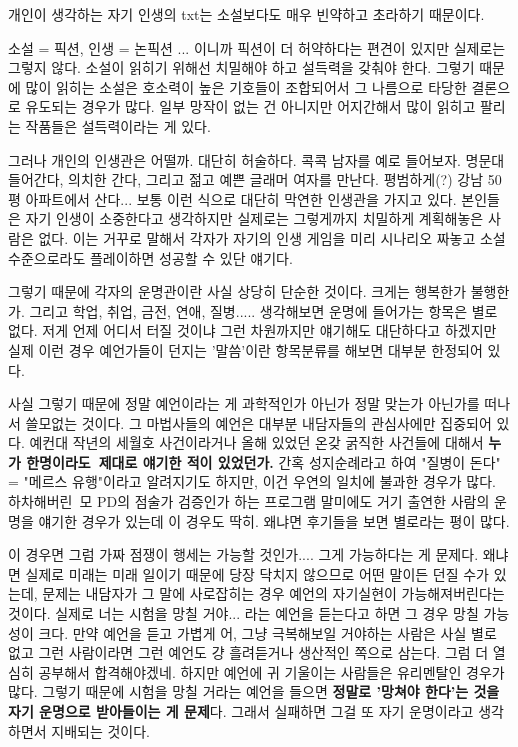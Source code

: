개인이 생각하는 자기 인생의 txt는
소설보다도 매우 빈약하고 초라하기 때문이다.
\vspace{5mm}

소설 = 픽션, 인생 = 논픽션 ... 이니까 픽션이 더 허약하다는 편견이 있지만 실제로는 그렇지 않다.
소설이 읽히기 위해선 치밀해야 하고 설득력을 갖춰야 한다.
그렇기 때문에 많이 읽히는 소설은 호소력이 높은 기호들이 조합되어서 그 나름으로 타당한 결론으로 유도되는 경우가 많다.
일부 망작이 없는 건 아니지만 어지간해서 많이 읽히고 팔리는 작품들은 설득력이라는 게 있다.
\vspace{5mm}

그러나 개인의 인생관은 어떨까.
대단히 허술하다.
콕콕 남자를 예로 들어보자.
명문대 들어간다, 의치한 간다, 그리고 젊고 예쁜 글래머 여자를 만난다.
평범하게(?) 강남 50평 아파트에서 산다...
보통 이런 식으로 대단히 막연한 인생관을 가지고 있다.
본인들은 자기 인생이 소중한다고 생각하지만 실제로는 그렇게까지 치밀하게 계획해놓은 사람은 없다.
이는 거꾸로 말해서 각자가 자기의 인생 게임을 미리 시나리오 짜놓고 소설 수준으로라도 플레이하면 성공할 수 있단 얘기다.
\vspace{5mm}

그렇기 때문에 각자의 운명관이란 사실 상당히 단순한 것이다.
크게는 행복한가 불행한가.
그리고 학업, 취업, 금전, 연애, 질병.....
생각해보면 운명에 들어가는 항목은 별로 없다.
저게 언제 어디서 터질 것이냐 그런 차원까지만 얘기해도 대단하다고 하겠지만
실제 이런 경우 예언가들이 던지는 '말씀'이란 항목분류를 해보면 대부분 한정되어 있다.
\vspace{5mm}

사실 그렇기 때문에 정말 예언이라는 게 과학적인가 아닌가 정말 맞는가 아닌가를 떠나서 쓸모없는 것이다.
그 마법사들의 예언은 대부분 내담자들의 관심사에만 집중되어 있다.
예컨대 작년의 세월호 사건이라거나 올해 있었던 온갖 굵직한 사건들에 대해서 \textbf{누가 한명이라도 제대로 얘기한 적이 있었던가.}
간혹 성지순례라고 하여 "질병이 돈다" = "메르스 유행"이라고 알려지기도 하지만, 이건 우연의 일치에 불과한 경우가 많다.
하차해버린 모 PD의 점술가 검증인가 하는 프로그램 말미에도 거기 출연한 사람의 운명을 얘기한 경우가 있는데
이 경우도 딱히. 왜냐면 후기들을 보면 별로라는 평이 많다.
\vspace{5mm}

이 경우면 그럼 가짜 점쟁이 행세는 가능할 것인가.... 그게 가능하다는 게 문제다.
왜냐면 실제로 미래는 미래 일이기 때문에 당장 닥치지 않으므로 어떤 말이든 던질 수가 있는데,
문제는 내담자가 그 말에 사로잡히는 경우 예언의 자기실현이 가능해져버린다는 것이다.
실제로 너는 시험을 망칠 거야... 라는 예언을 듣는다고 하면 그 경우 망칠 가능성이 크다.
만약 예언을 듣고 가볍게 어, 그냥 극복해보일 거야하는 사람은 사실 별로 없고 그런 사람이라면 그런 예언도 걍 흘려듣거나
생산적인 쪽으로 삼는다. 그럼 더 열심히 공부해서 합격해야겠네.
하지만 예언에 귀 기울이는 사람들은 유리멘탈인 경우가 많다.
그렇기 때문에 시험을 망칠 거라는 예언을 들으면 \textbf{정말로 '망쳐야 한다'는 것을 자기 운명으로 받아들이는 게 문제}다.
그래서 실패하면 그걸 또 자기 운명이라고 생각하면서 지배되는 것이다.
\vspace{5mm}

